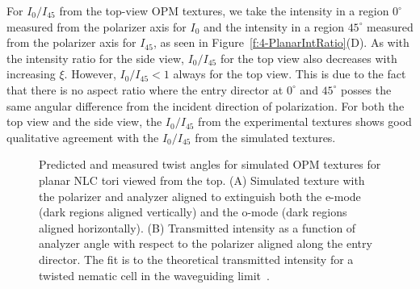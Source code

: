For $I_0/I_{45}$ from the top-view OPM textures, we take the intensity in a region  $0^{\circ}$ measured from the polarizer axis for $I_0$ and the intensity in a region $45^{\circ}$ measured from the polarizer axis for $I_{45}$, as seen in Figure~\ref{f:4-PlanarIntRatio}(D).
As with the intensity ratio for the side view, $I_0/I_{45}$ for the top view also decreases with increasing $\xi$. However, $I_0/I_{45}<1$ always for the top view.
This is due to the fact that there is no aspect ratio where the entry director at $0^{\circ}$ and $45^{\circ}$ posses the same angular difference from the incident direction of polarization.
For both the top view and the side view, the $I_0/I_{45}$ from the experimental textures shows good qualitative agreement with the $I_0/I_{45}$ from the simulated textures.
\begin{figure}
\centering
\caption{Predicted and measured twist angles for simulated OPM textures for planar NLC tori viewed from the top.
(A) Simulated texture with the polarizer and analyzer aligned to extinguish both the e-mode (dark regions aligned vertically) and the o-mode (dark regions aligned horizontally).
(B) Transmitted intensity as a function of analyzer angle with respect to the polarizer aligned along the entry director.
The fit is to the theoretical transmitted intensity for a twisted nematic cell in the waveguiding limit~\cite{RN232}.}\label{f:4-PlanarTwist}
\end{figure}

